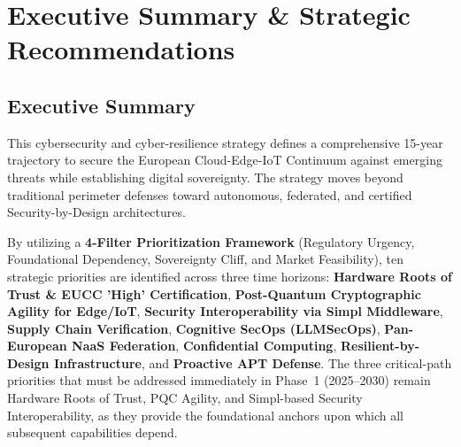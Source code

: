 \documentclass{ieeeaccess}
\begin{document}

\section{Executive Summary \& Strategic Recommendations}

\subsection*{Executive Summary}
This cybersecurity and cyber-resilience strategy defines a comprehensive 15-year trajectory
to secure the European Cloud-Edge-IoT Continuum against emerging threats while establishing
digital sovereignty. The strategy moves beyond traditional perimeter defenses toward
autonomous, federated, and certified Security-by-Design architectures.

By utilizing a \textbf{4-Filter Prioritization Framework} (Regulatory Urgency, Foundational
Dependency, Sovereignty Cliff, and Market Feasibility), ten strategic priorities are
identified across three time horizons: \textbf{Hardware Roots of Trust \& EUCC 'High'
Certification}, \textbf{Post-Quantum Cryptographic Agility for Edge/IoT}, \textbf{Security
Interoperability via Simpl Middleware}, \textbf{Supply Chain Verification}, \textbf{Cognitive
SecOps (LLMSecOps)}, \textbf{Pan-European NaaS Federation}, \textbf{Confidential Computing},
\textbf{Resilient-by-Design Infrastructure}, and \textbf{Proactive APT Defense}. The three
critical-path priorities that must be addressed immediately in Phase~1 (2025--2030) remain
Hardware Roots of Trust, PQC Agility, and Simpl-based Security Interoperability, as they
provide the foundational anchors upon which all subsequent capabilities depend.
\end{document}
